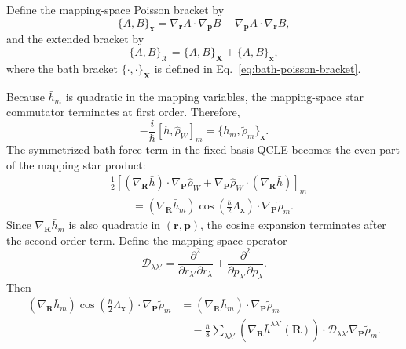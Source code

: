 \documentclass[
  11pt,
  letterpaper,
  onehalfspacing,
  normalmargins,
  equalmargins,
  oneside
]{ut-thesis}
\begin{document}
Define the mapping-space Poisson bracket by
\begin{equation}
\{A,B\}_{\mathbf x}
=
\nabla_{\mathbf r}A\cdot\nabla_{\mathbf p}B
-
\nabla_{\mathbf p}A\cdot\nabla_{\mathbf r}B,
\label{eq:mapping-qcle-mapping-poisson-bracket}
\end{equation}
and the extended bracket by
\begin{equation}
\{A,B\}_{\boldsymbol{\mathcal X}}
=
\{A,B\}_{\mathbf X}
+
\{A,B\}_{\mathbf x},
\label{eq:mapping-qcle-extended-poisson-bracket}
\end{equation}
where the bath bracket \(\{\cdot,\cdot\}_{\mathbf X}\) is defined in
Eq.~\eqref{eq:bath-poisson-bracket}.

Because \(\bar h_m\) is quadratic in the mapping variables, the mapping-space
star commutator terminates at first order. Therefore,
\begin{equation}
-\frac{i}{\hbar}
[\bar h,\hat\rho_W]_m
=
\{\bar h_m,\tilde\rho_m\}_{\mathbf x}.
\label{eq:mapping-qcle-commutator-map}
\end{equation}
The symmetrized bath-force term in the fixed-basis QCLE becomes the even part
of the mapping star product:
\begin{align}
&\frac{1}{2}
\left[
(\nabla_{\mathbf R}\bar h)\cdot\nabla_{\mathbf P}\hat\rho_W
+
\nabla_{\mathbf P}\hat\rho_W\cdot(\nabla_{\mathbf R}\bar h)
\right]_m
\nonumber\\
&\qquad=
(\nabla_{\mathbf R}\bar h_m)
\cos\left(
\frac{\hbar}{2}\Lambda_{\mathbf x}
\right)
\cdot\nabla_{\mathbf P}\tilde\rho_m.
\label{eq:mapping-qcle-force-cosine-map}
\end{align}
Since \(\nabla_{\mathbf R}\bar h_m\) is also quadratic in
\((\mathbf r,\mathbf p)\), the cosine expansion terminates after the
second-order term. Define the mapping-space operator
\begin{equation}
\mathcal D_{\lambda\lambda'}
=
\frac{\partial^2}{\partial r_{\lambda'}\partial r_\lambda}
+
\frac{\partial^2}{\partial p_{\lambda'}\partial p_\lambda}.
\label{eq:mapping-second-derivative-operator}
\end{equation}
Then
\begin{align}
(\nabla_{\mathbf R}\bar h_m)
\cos\left(
\frac{\hbar}{2}\Lambda_{\mathbf x}
\right)
\cdot\nabla_{\mathbf P}\tilde\rho_m
&=
(\nabla_{\mathbf R}\bar h_m)
\cdot\nabla_{\mathbf P}\tilde\rho_m
\nonumber\\
&\quad
-
\frac{\hbar}{8}
\sum_{\lambda\lambda'}
\left(
\nabla_{\mathbf R}\bar h^{\lambda\lambda'}(\mathbf R)
\right)
\cdot
\mathcal D_{\lambda\lambda'}
\nabla_{\mathbf P}\tilde\rho_m.
\label{eq:mapping-qcle-force-cosine-expanded}
\end{align}
\end{document}
